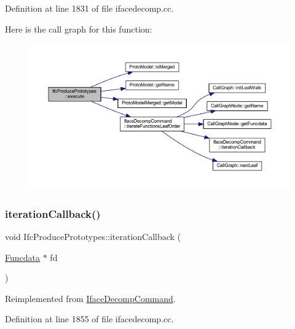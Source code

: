Definition at line 1831 of file ifacedecomp.\+cc.

Here is the call graph for this function\+:
\nopagebreak
\begin{figure}[H]
\begin{center}
\leavevmode
\includegraphics[width=350pt]{class_ifc_produce_prototypes_a26647bb5ac26d0ab368034f8c1823289_cgraph}
\end{center}
\end{figure}
\mbox{\label{class_ifc_produce_prototypes_abff378a291a5e7dd0c24d8ced5c9c4ea}} 
\subsubsection{\texorpdfstring{iterationCallback()}{iterationCallback()}}
{\footnotesize\ttfamily void Ifc\+Produce\+Prototypes\+::iteration\+Callback (\begin{DoxyParamCaption}\item[{\mbox{\hyperlink{class_funcdata}{Funcdata}} $\ast$}]{fd }\end{DoxyParamCaption})\hspace{0.3cm}{\ttfamily [virtual]}}



Reimplemented from \mbox{\hyperlink{class_iface_decomp_command_a619d9358a4e77bef66a26f02ea7a6c8e}{Iface\+Decomp\+Command}}.



Definition at line 1855 of file ifacedecomp.\+cc.

